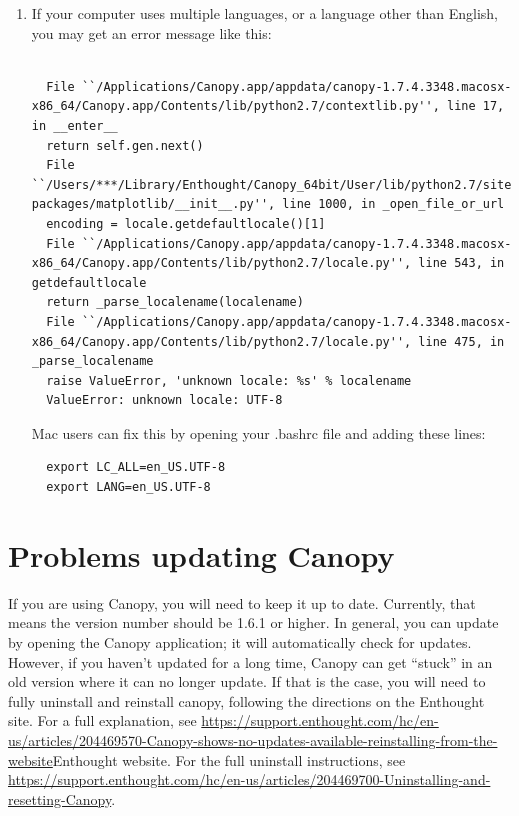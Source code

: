 \documentclass[11pt]{book}
\begin{document}
{{{\begin{enumerate}
\item
  If your computer uses multiple languages, or a language other than English, you may get an error message like this:
  \begin{verbatim}

  File ``/Applications/Canopy.app/appdata/canopy-1.7.4.3348.macosx-x86_64/Canopy.app/Contents/lib/python2.7/contextlib.py'', line 17, in __enter__
  return self.gen.next()
  File ``/Users/***/Library/Enthought/Canopy_64bit/User/lib/python2.7/site-packages/matplotlib/__init__.py'', line 1000, in _open_file_or_url
  encoding = locale.getdefaultlocale()[1]
  File ``/Applications/Canopy.app/appdata/canopy-1.7.4.3348.macosx-x86_64/Canopy.app/Contents/lib/python2.7/locale.py'', line 543, in getdefaultlocale
  return _parse_localename(localename)
  File ``/Applications/Canopy.app/appdata/canopy-1.7.4.3348.macosx-x86_64/Canopy.app/Contents/lib/python2.7/locale.py'', line 475, in _parse_localename
  raise ValueError, 'unknown locale: %s' % localename
  ValueError: unknown locale: UTF-8
  \end{verbatim}
  Mac users can fix this by opening your .bashrc file and adding these lines:
  \begin{verbatim}
  export LC_ALL=en_US.UTF-8
  export LANG=en_US.UTF-8
  \end{verbatim}

\end{enumerate}

\section{Problems updating Canopy}
If you are using Canopy, you will need to keep it up to date.  Currently, that means the version number should be 1.6.1 or higher.  In general, you can update by opening the Canopy application; it will automatically check for updates.  However, if you haven't updated for a long time, Canopy can get ``stuck'' in an old version where it can no longer update.  If that is the case, you will need to fully uninstall and reinstall canopy, following the directions on the Enthought site.  For a full explanation, see \href{this support article}{https://support.enthought.com/hc/en-us/articles/204469570-Canopy-shows-no-updates-available-reinstalling-from-the-website}{Enthought website}.  For the full uninstall instructions, see \href{these directions}{https://support.enthought.com/hc/en-us/articles/204469700-Uninstalling-and-resetting-Canopy}.

}}}
\end{document}
